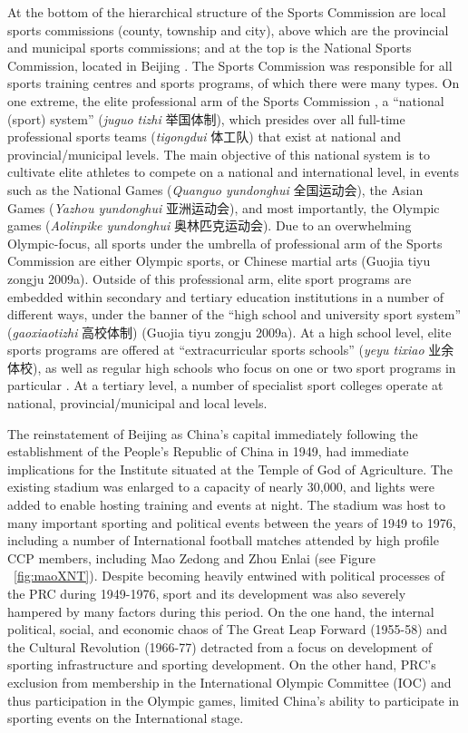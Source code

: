 {At the bottom of the hierarchical structure of the Sports Commission are local sports commissions (county, township and city), above which are the provincial and municipal sports commissions; and at the top is the National Sports Commission, located in Beijing \citep[59]{Brownell1995}.  The Sports Commission was responsible for all sports training centres and sports programs, of which there were many types.  On one extreme, the elite professional arm of the Sports Commission , a ``national (sport) system'' (\textit{juguo tizhi} 举国体制), which presides over all full-time professional sports teams (\textit{tigongdui} 体工队) that exist at national and provincial/municipal levels.  The main objective of this national system is to cultivate elite athletes to compete on a national and international level, in events such as the National Games (\textit{Quanguo yundonghui} 全国运动会), the Asian Games (\textit{Yazhou yundonghui} 亚洲运动会), and most importantly, the Olympic games (\textit{Aolinpike yundonghui} 奥林匹克运动会).  Due to an overwhelming Olympic-focus, all sports under the umbrella of professional arm of the Sports Commission are either Olympic sports, or Chinese martial arts (Guojia tiyu zongju 2009a).  Outside of this professional arm, elite sport programs are embedded within secondary and tertiary education institutions in a number of different ways, under the banner of the ``high school and university sport system'' (\textit{gaoxiaotizhi} 高校体制) (Guojia tiyu zongju 2009a).  At a high school level, elite sports programs are offered at ``extracurricular sports schools'' (\textit{yeyu tixiao} 业余体校), as well as regular high schools who focus on one or two sport programs in particular \citep[59]{Brownell1995}. At a tertiary level, a number of specialist sport colleges operate at national, provincial/municipal and local levels.

The reinstatement of Beijing as China's capital immediately following the establishment of the People's Republic of China in 1949, had immediate implications for the Institute situated at the Temple of God of Agriculture.  The existing stadium was enlarged to a capacity of nearly 30,000, and lights were added to enable hosting training and events at night.  The stadium was host to many important sporting and political events between the years of 1949 to 1976, including a number of International football matches attended by high profile CCP members, including Mao Zedong and Zhou Enlai (see Figure ~\ref{fig:maoXNT}).  Despite becoming heavily entwined with political processes of the PRC during 1949-1976, sport and its development was also severely hampered by many factors during this period.  On the one hand, the internal political, social, and economic chaos of The Great Leap Forward (1955-58) and the Cultural Revolution (1966-77) detracted from a focus on development of sporting infrastructure and sporting development.  On the other hand, PRC's exclusion from membership in the International Olympic Committee (IOC) and thus participation in the Olympic games, limited China's ability to participate in sporting events on the International stage.

}
